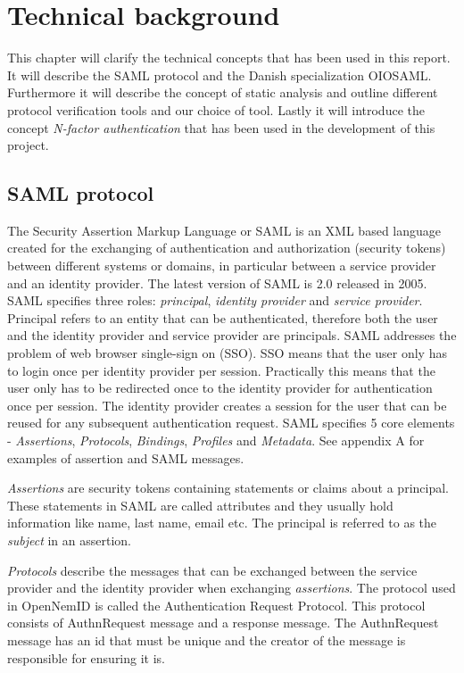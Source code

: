 \documentclass[twosided]{report}
\begin{document}
\chapter{Technical background}
\label{chap:techbg}
This chapter will clarify the technical concepts that has been used in this report. It will describe the SAML protocol and the Danish specialization OIOSAML. Furthermore it will describe the concept of static analysis and outline different protocol verification tools and our choice of tool. Lastly it will introduce the concept \emph{N-factor authentication} that has been used in the development of this project.

\section{SAML protocol}
The Security Assertion Markup Language or SAML is an XML based language created for the exchanging of authentication and authorization (security tokens) between different systems or domains, in particular between a service provider and an identity provider. The latest version of SAML is 2.0 released in 2005. SAML specifies three roles: \emph{principal}, \emph{identity provider} and \emph{service provider}. Principal refers to an entity that can be authenticated, therefore both the user and the identity provider and service provider are principals. SAML addresses the problem of web browser single-sign on (SSO). SSO means that the user only has to login once per identity provider per session. Practically this means that the user only has to be redirected once to the identity provider for authentication once per session. The identity provider creates a session for the user that can be reused for any subsequent authentication request. SAML specifies 5 core elements - \emph{Assertions}, \emph{Protocols}, \emph{Bindings}, \emph{Profiles} and \emph{Metadata}. See appendix A for examples of assertion and SAML messages.
\par
\emph{Assertions} are security tokens containing statements or claims about a principal. These statements in SAML are called attributes and they usually hold information like name, last name, email etc. The principal is referred to as the \emph{subject} in an assertion.
\par
\emph{Protocols} describe the messages that can be exchanged between the service provider and the identity provider when exchanging \emph{assertions}. The protocol used in OpenNemID is called the Authentication Request Protocol. This protocol consists of AuthnRequest message and a response message. The AuthnRequest message has an id that must be unique and the creator of the message is responsible for ensuring it is.
\end{document}
